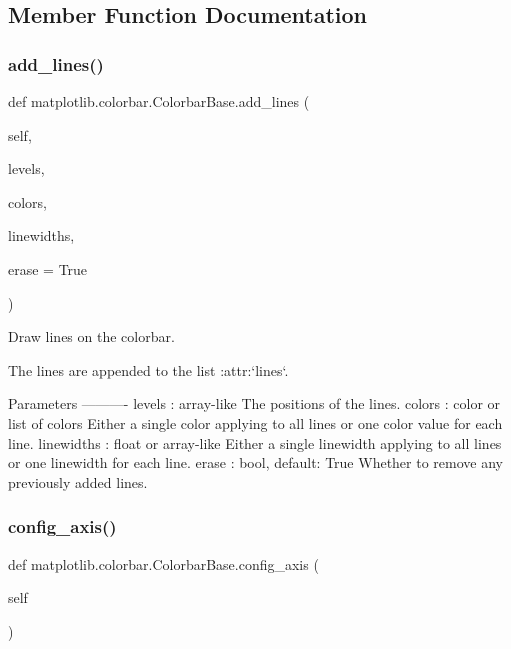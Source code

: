 \subsection{Member Function Documentation}
\mbox{\label{classmatplotlib_1_1colorbar_1_1ColorbarBase_adbbd5385693248f6f687424ecc021f06}} 
\subsubsection{\texorpdfstring{add\+\_\+lines()}{add\_lines()}}
{\footnotesize\ttfamily def matplotlib.\+colorbar.\+Colorbar\+Base.\+add\+\_\+lines (\begin{DoxyParamCaption}\item[{}]{self,  }\item[{}]{levels,  }\item[{}]{colors,  }\item[{}]{linewidths,  }\item[{}]{erase = {\ttfamily True} }\end{DoxyParamCaption})}

\begin{DoxyVerb}Draw lines on the colorbar.

The lines are appended to the list :attr:`lines`.

Parameters
----------
levels : array-like
    The positions of the lines.
colors : color or list of colors
    Either a single color applying to all lines or one color value for
    each line.
linewidths : float or array-like
    Either a single linewidth applying to all lines or one linewidth
    for each line.
erase : bool, default: True
    Whether to remove any previously added lines.
\end{DoxyVerb}
 \mbox{\label{classmatplotlib_1_1colorbar_1_1ColorbarBase_a37c7063156e737af5d60cecd602fd55d}} 
\subsubsection{\texorpdfstring{config\+\_\+axis()}{config\_axis()}}
{\footnotesize\ttfamily def matplotlib.\+colorbar.\+Colorbar\+Base.\+config\+\_\+axis (\begin{DoxyParamCaption}\item[{}]{self }\end{DoxyParamCaption})}

